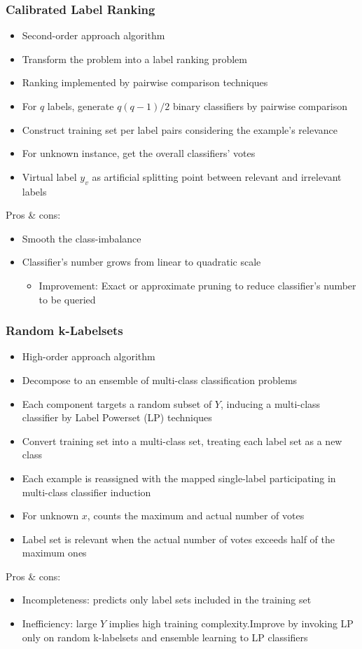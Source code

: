 \documentclass{beamer}
\begin{document}
\begin{frame}
\frametitle{Calibrated Label Ranking}
\begin{itemize}
	\item Second-order approach algorithm
	\item Transform the problem into a label ranking problem
	\item Ranking implemented by pairwise comparison techniques
	\item For $q$ labels, generate $q(q-1)/2$ binary classifiers by pairwise comparison
	\item Construct training set per label pairs considering the example's relevance
	\item For unknown instance, get the overall classifiers' votes
	\item Virtual label $y_v$ as artificial splitting point between relevant and irrelevant labels
\end{itemize}
Pros \& cons:
\begin{itemize}
	\item Smooth the class-imbalance
	\item Classifier's number grows from linear to quadratic scale
	\begin{itemize}
		\item Improvement: Exact or approximate pruning to reduce classifier's number to be queried
	\end{itemize}
\end{itemize}
\end{frame}
\begin{frame}
\frametitle{Random k-Labelsets}
\begin{itemize}
	\item High-order approach algorithm
	\item Decompose to an ensemble of multi-class classification problems
	\item Each component targets a random subset of $Y$, inducing a multi-class classifier by Label Powerset (LP) techniques
	\item Convert training set into a multi-class set, treating each label set as a new class
	\item Each example is reassigned with the mapped single-label participating in multi-class classifier induction
	\item For unknown $x$, counts the maximum and actual number of votes
	\item Label set is relevant when the actual number of votes exceeds
half of the maximum ones
\end{itemize}
Pros \& cons:
\begin{itemize}
	\item Incompleteness: predicts only label sets included in the training set
	\item Inefficiency: large $Y$ implies high training complexity.Improve by invoking LP only on random k-labelsets and ensemble learning to LP classifiers
\end{itemize}
\end{frame}
\end{document}
